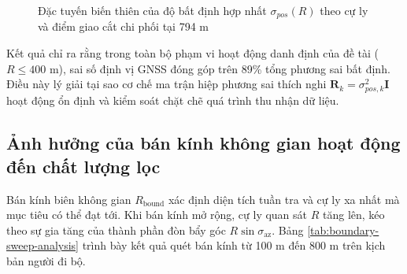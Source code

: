 \begin{figure}[H]
\centering
{}
\caption{Đặc tuyến biến thiên của độ bất định hợp nhất $\sigma_{pos}(R)$ theo cự ly và điểm giao cắt chi phối tại 794 m}
\label{fig:sigma-pos-range}
\end{figure}

Kết quả chỉ ra rằng trong toàn bộ phạm vi hoạt động danh định của đề tài ($R \le 400$ m), sai số định vị GNSS đóng góp trên 89\% tổng phương sai bất định. Điều này lý giải tại sao cơ chế ma trận hiệp phương sai thích nghi $\mathbf{R}_k = \sigma_{pos, k}^2 \mathbf{I}$ hoạt động ổn định và kiểm soát chặt chẽ quá trình thu nhận dữ liệu.

\subsection{Ảnh hưởng của bán kính không gian hoạt động đến chất lượng lọc}

\hspace{0.5cm} Bán kính biên không gian $R_{\text{bound}}$ xác định diện tích tuần tra và cự ly xa nhất mà mục tiêu có thể đạt tới. Khi bán kính mở rộng, cự ly quan sát $R$ tăng lên, kéo theo sự gia tăng của thành phần đòn bẩy góc $R \sin\sigma_{\text{az}}$. Bảng \ref{tab:boundary-sweep-analysis} trình bày kết quả quét bán kính từ 100 m đến 800 m trên kịch bản người đi bộ.

